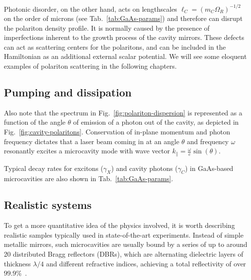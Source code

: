Photonic disorder, on the other hand, acts on lengthscales
$\ell_{C} = (m_{C}\Omega_R)^{-1/2}$ on the order of microns (see
Tab.~\ref{tab:GaAs-params}) and therefore can disrupt the polariton
density profile. It is normally caused by the presence of
imperfections inherent to the growth process of the cavity
mirrors. These defects can act as scattering centers for the
polaritons, and can be included in the Hamiltonian as an additional
external scalar potential. We will see some eloquent examples of
polariton scattering in the following chapters.


\subsection{Pumping and dissipation}
\label{subsec:pumping}

Also note that the spectrum in Fig.~\ref{fig:polariton-dispersion} is
represented as a function of the angle $\theta$ of emission of a
photon out of the cavity, as depicted in
Fig.~\ref{fig:cavity-polaritons}. Conservation of in-plane momentum
and photon frequency dictates that a laser beam coming in at an angle
$\theta$ and frequency $\omega$ resonantly excites a microcavity mode
with wave vector $k_{\parallel} = \frac{\omega}{c}\sin(\theta)$.

Typical decay rates for excitons
($\gamma_X$) and cavity photons ($\gamma_C$) in GaAs-based
microcavities are also shown in Tab.~\ref{tab:GaAs-params}.






\subsection{Realistic systems}
\label{subsec:realistic}

To get a more quantitative idea of the physics involved, it is worth
describing realistic samples typically used in state-of-the-art
experiments. Instead of simple metallic mirrors, such microcavities
are usually bound by a series of up to around 20 distributed Bragg
reflectors (DBRs), which are alternating dielectric layers of
thickness $\lambda/4$ and different refractive indices, achieving a
total reflectivity of over $99.9$\%~\cite{9780199228942}. 

